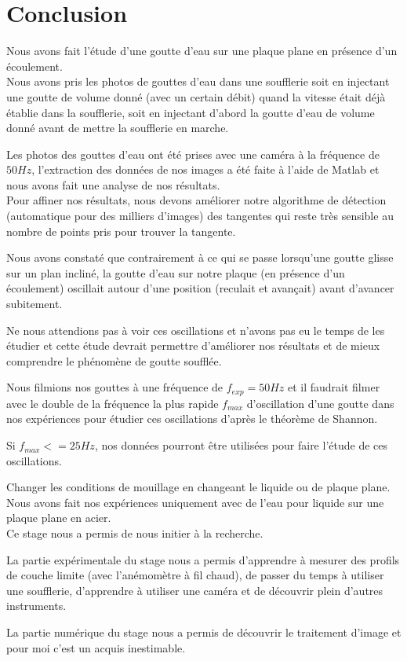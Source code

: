 \chapter{Conclusion}\label{ch:conclusion}

Nous avons fait l'étude d'une goutte d'eau sur une plaque plane en présence d'un écoulement.\\

Nous avons pris les photos de gouttes d'eau dans une soufflerie soit en injectant une goutte de volume donné (avec un certain débit) quand la vitesse était déjà établie dans la soufflerie, soit en injectant d'abord la goutte d'eau de volume donné avant de mettre la soufflerie en marche.

Les photos des gouttes d'eau ont été prises avec une caméra à la fréquence de $50Hz$, l'extraction des données de nos images a été faite à l'aide de Matlab et nous avons fait une analyse de nos résultats.\\


Pour affiner nos résultats, nous devons améliorer notre algorithme de détection (automatique pour des milliers d'images) des tangentes qui reste très sensible au nombre de points pris pour trouver la tangente.

Nous avons constaté que contrairement à ce qui se passe lorsqu'une goutte glisse sur un plan incliné, 
la goutte d'eau sur notre plaque (en présence d'un écoulement) oscillait autour d'une position (reculait et avançait) avant d'avancer subitement.

Ne nous attendions pas à voir ces oscillations et n'avons pas eu le temps de les étudier et cette étude devrait permettre d'améliorer nos résultats et de mieux comprendre le phénomène de goutte soufflée.

Nous filmions nos gouttes à une fréquence de $f_{exp} = 50Hz$ et il faudrait filmer avec le double de la fréquence la plus rapide $f_{max}$ d'oscillation d'une goutte dans nos expériences  pour étudier ces oscillations d'après le théorème de Shannon.

Si $f_{max} <= 25 Hz$, nos données pourront être utilisées pour faire l'étude de ces oscillations.


Changer les conditions de mouillage en changeant le liquide ou de plaque plane. Nous avons fait nos expériences uniquement avec de l'eau pour liquide sur une plaque plane en acier. \\

Ce stage nous a permis de nous initier à la recherche.

La partie expérimentale du stage nous a  permis d'apprendre à mesurer des profils de couche limite (avec l'anémomètre à fil chaud), de passer du temps à utiliser une soufflerie, d'apprendre à utiliser une caméra et de découvrir plein d'autres instruments.

La partie numérique du stage nous a permis de découvrir le traitement d'image et pour moi c'est un acquis inestimable.